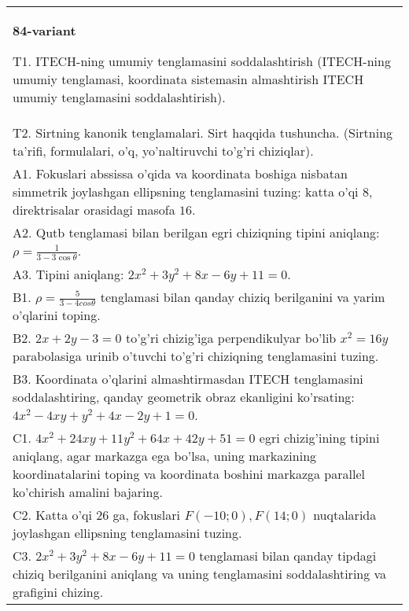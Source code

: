 \documentclass{article}
\begin{document}
\begin{tabular}{m{17cm}}
\textbf{84-variant}
\newline

T1. ITECH-ning umumiy tenglamasini soddalashtirish (ITECH-ning umumiy tenglamasi, koordinata sistemasin almashtirish ITECH umumiy tenglamasini soddalashtirish).\\

T2. Sirtning kanonik tenglamalari. Sirt haqqida tushuncha. (Sirtning ta'rifi, formulalari, o'q, yo'naltiruvchi to'g'ri chiziqlar).\\

A1. Fokuslari abssissa o'qida va koordinata boshiga nisbatan simmetrik joylashgan ellipsning tenglamasini tuzing: katta o'qi $8$, direktrisalar orasidagi masofa $16$.\\

A2. Qutb tenglamasi bilan berilgan egri chiziqning tipini aniqlang: $\rho=\frac{1}{3-3\cos\theta}$.\\

A3. Tipini aniqlang: $2x^{2}+3y^{2}+8x-6y+11=0$.\\

B1. $\rho = \frac{5}{3 - 4cos\theta}$ tenglamasi bilan qanday chiziq berilganini va yarim o'qlarini toping.  \\

B2. $2x + 2y - 3 = 0$ to'g'ri chizig'iga perpendikulyar bo'lib $x^{2} = 16y$ parabolasiga urinib o'tuvchi to'g'ri chiziqning tenglamasini tuzing.  \\

B3. Koordinata o'qlarini almashtirmasdan ITECH tenglamasini soddalashtiring, qanday geometrik obraz ekanligini ko'rsating: $4x^{2} - 4xy + y^{2} + 4x - 2y + 1 = 0$.  \\

C1. $4x^{2} + 24xy + 11y^{2} + 64x + 42y + 51 = 0$ egri chizig'ining tipini aniqlang, agar markazga ega bo'lsa, uning markazining koordinatalarini toping va koordinata boshini markazga parallel ko'chirish amalini bajaring.\\

C2. Katta o'qi 26 ga, fokuslari $F( - 10;0), F(14;0)$ nuqtalarida joylashgan ellipsning tenglamasini tuzing.  \\

C3. $2x^{2} + 3y^{2} + 8x - 6y + 11 = 0$ tenglamasi bilan qanday tipdagi chiziq berilganini aniqlang va uning tenglamasini soddalashtiring va grafigini chizing.  \\

\end{tabular}
\vspace{1cm}
\end{document}

